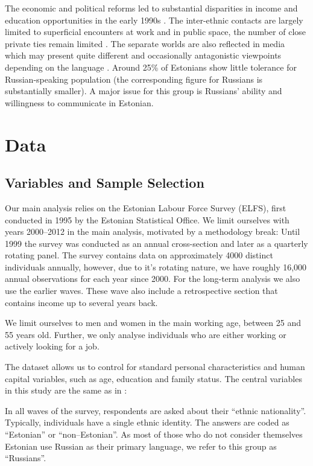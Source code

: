 \documentclass[12pt, a4paper]{article}
\begin{document}
The economic and political reforms led to substantial
disparities in income and education opportunities
in the early 1990s \citep{Leping2008,
	lindemann+saar2011Russian2ndGeneration}.  The inter-ethnic contacts
are largely limited to superficial encounters at work and in public
space, the number of close private ties remain limited
\citep{korts2009JofBaltStud}.  The
separate worlds are also reflected in media which may present quite
different and occasionally antagonistic viewpoints depending on the
language \citep{Korts2002}.  Around 25\% of Estonians show little
tolerance for Russian-speaking population (the corresponding figure
for Russians is substantially smaller).  A major issue for this group
is Russians' ability and willingness to communicate in Estonian.


\section{Data}
\label{subsec:ss_var}

\subsection{Variables and Sample Selection}
\label{sec:variables}

Our main analysis relies on the Estonian Labour Force Survey (ELFS),
first conducted in 1995 by the Estonian Statistical Office.  We limit
ourselves with years 2000--2012 in the main analysis, motivated by a
methodology break: Until 1999 the survey was conducted as an annual
cross-section and later as a quarterly rotating panel.  The survey
contains data on approximately 4000 distinct individuals annually,
however, due to it's rotating nature, we have roughly 16,000 annual
observations for each year since 2000.  For the long-term analysis we
also use the earlier waves.  These wave also include a retrospective
section that contains income up to several years back.

We limit ourselves to men and women in the main working age, between 25 and
55 years old.  Further, we only analyse
individuals who are either working or actively looking for a job.

The dataset allows us to control for standard personal
characteristics and human capital variables, such as age, education
and family status.  The central variables in this study are the same
as in \citep{Leping2008}:

In all waves of the survey, respondents are asked about their
``ethnic nationality''.  Typically, individuals have a single ethnic
identity.  The answers are coded as ``Estonian'' or
``non--Estonian''.  As most of those who do not consider themselves
Estonian use Russian as their primary language, we refer to this group
as ``Russians''.
\end{document}
